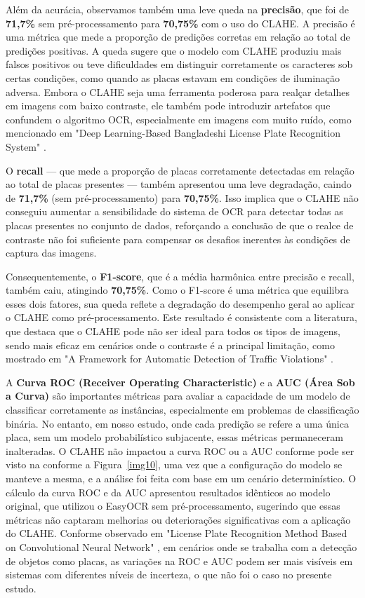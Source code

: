 \documentclass[conference]{IEEEtran}
\begin{document}
Além da acurácia, observamos também uma leve queda na \textbf{precisão}, que foi de \textbf{71,7\%} sem pré-processamento para \textbf{70,75\%} com o uso do CLAHE. A precisão é uma métrica que mede a proporção de predições corretas em relação ao total de predições positivas. A queda sugere que o modelo com CLAHE produziu mais falsos positivos ou teve dificuldades em distinguir corretamente os caracteres sob certas condições, como quando as placas estavam em condições de iluminação adversa. Embora o CLAHE seja uma ferramenta poderosa para realçar detalhes em imagens com baixo contraste, ele também pode introduzir artefatos que confundem o algoritmo OCR, especialmente em imagens com muito ruído, como mencionado em "Deep Learning-Based Bangladeshi License Plate Recognition System" \cite{b11}.

O \textbf{recall} — que mede a proporção de placas corretamente detectadas em relação ao total de placas presentes — também apresentou uma leve degradação, caindo de \textbf{71,7\%} (sem pré-processamento) para \textbf{70,75\%}. Isso implica que o CLAHE não conseguiu aumentar a sensibilidade do sistema de OCR para detectar todas as placas presentes no conjunto de dados, reforçando a conclusão de que o realce de contraste não foi suficiente para compensar os desafios inerentes às condições de captura das imagens.

Consequentemente, o \textbf{F1-score}, que é a média harmônica entre precisão e recall, também caiu, atingindo \textbf{70,75\%}. Como o F1-score é uma métrica que equilibra esses dois fatores, sua queda reflete a degradação do desempenho geral ao aplicar o CLAHE como pré-processamento. Este resultado é consistente com a literatura, que destaca que o CLAHE pode não ser ideal para todos os tipos de imagens, sendo mais eficaz em cenários onde o contraste é a principal limitação, como mostrado em "A Framework for Automatic Detection of Traffic Violations" \cite{b12}.

A \textbf{Curva ROC (Receiver Operating Characteristic)} e a \textbf{AUC (Área Sob a Curva)} são importantes métricas para avaliar a capacidade de um modelo de classificar corretamente as instâncias, especialmente em problemas de classificação binária. No entanto, em nosso estudo, onde cada predição se refere a uma única placa, sem um modelo probabilístico subjacente, essas métricas permaneceram inalteradas. O CLAHE não impactou a curva ROC ou a AUC conforme pode ser visto na conforme a Figura~\ref{img10}, uma vez que a configuração do modelo se manteve a mesma, e a análise foi feita com base em um cenário determinístico. O cálculo da curva ROC e da AUC apresentou resultados idênticos ao modelo original, que utilizou o EasyOCR sem pré-processamento, sugerindo que essas métricas não captaram melhorias ou deteriorações significativas com a aplicação do CLAHE. Conforme observado em "License Plate Recognition Method Based on Convolutional Neural Network" \cite{b14}, em cenários onde se trabalha com a detecção de objetos como placas, as variações na ROC e AUC podem ser mais visíveis em sistemas com diferentes níveis de incerteza, o que não foi o caso no presente estudo.
\end{document}
